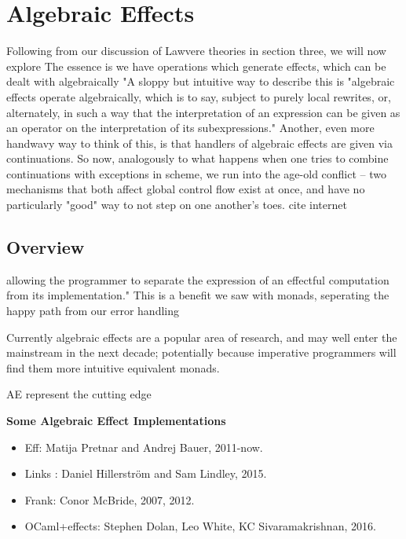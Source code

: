 \section{Algebraic Effects}
Following from our discussion of Lawvere theories
in section three,
we will now explore 
The essence is
we have operations which generate effects,
which can be dealt with algebraically
"A sloppy but intuitive way to describe this is "algebraic effects operate algebraically,
which is to say,
subject to purely local rewrites, or, alternately,
in such a way that the interpretation of an expression
can be given as an operator on the interpretation of its subexpressions."
Another, even more handwavy way to think of this,
is that handlers of algebraic effects are given via continuations.
So now, analogously to what happens when one tries to combine continuations
with exceptions in scheme, we run into the age-old conflict --
two mechanisms that both affect global control flow exist at once,
and have no particularly "good" way to not step on one another's toes.
cite internet

\subsection{Overview}


allowing the programmer to separate the expression of an effectful computation from its implementation."
\cite{dolan2015effective}
This is a benefit we saw with monads,
seperating the happy path from our error handling

Currently algebraic effects are a popular area of research,
and may well enter the mainstream in the next decade;
potentially because imperative programmers
will find them more intuitive equivalent monads.

AE represent the cutting edge

\textbf{Some Algebraic Effect Implementations}
\begin{itemize}
    \item Eff: Matija Pretnar and Andrej Bauer, 2011-now.
    \item Links : Daniel Hillerström and Sam Lindley, 2015.
    \item Frank: Conor McBride, 2007, 2012.
    \item OCaml+effects: Stephen Dolan, Leo White, KC Sivaramakrishnan, 2016.
\end{itemize}

